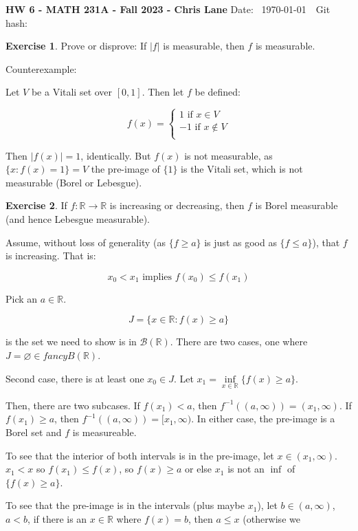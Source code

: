 \documentclass[11pt,oneside]{article}
\numberwithin{equation}{section}
\theoremstyle{definition}
\newtheorem{exercise}{Exercise}
\def\RR{\mathbb{R}}
\def\fancyB{\mathscr{B}}
\begin{document}
\textbf{HW 6 - MATH 231A - Fall 2023 - Chris Lane}
Date: \hhmmsstime{} \ \today \ \ Git hash: 

\begin{exercise}
  Prove or disprove: If $ |f| $ is measurable, then $f$ is measurable.
\end{exercise}
\begin{solution}
  Counterexample:

  Let $V$ be a Vitali set over $[0,1]$.  Then let $f$ be defined:

  $$
  f(x) = \begin{cases}
    1 \textrm{ if } x \in V \\
    -1 \textrm{ if } x \notin V \\
  \end{cases}
  $$

  Then $|f(x)| = 1$, identically.  But $f(x)$ is not measurable, as $
  \{ x : f(x) = 1 \} = V$ the pre-image of $\{1\}$ is the Vitali set,
  which is not measurable (Borel or Lebesgue).
\end{solution}

\begin{exercise}
  If $ f: \RR \to \RR$ is increasing or decreasing, then $f$ is Borel
  measurable (and hence Lebesgue measurable).

  Assume, without loss of generality (as $ \{ f \geq a \} $ is just as good as $ \{ f \leq a \}$),
  that $f$ is increasing.  That is:

  $$
  x_0 < x_1 \text { implies } f(x_0) \leq f(x_1)
  $$

  Pick an $a \in \RR$.

  $$
  J = \{ x \in \RR : f(x) \geq a \}
  $$

  is the set we need to show is in $\fancyB(\RR)$.  There are two cases, one
  where $ J = \varnothing \in fancyB(\RR)$.

  Second case, there is at least one $x_0 \in J$.
  Let $x_1 = \inf \limits _ { x \in \RR } \{ f(x) \geq a \}$.
  
  Then, there are two subcases.  If $f(x_1) < a$,
  then $f^{-1} ((a,  \infty)) = (x_1, \infty)$.  If $f(x_1) \geq a$,
  then $f^{-1} ((a, \infty)) = [x_1, \infty)$.
  In either case, the pre-image is a Borel
  set and $f$ is measureable.
    
  To see that the interior of both intervals is in the pre-image,
  let $x \in (x_1, \infty)$.  $x_1 < x$ so $f(x_1) \leq f(x)$, so $f(x) \geq a$
  or else $x_1$ is not an $\inf $ of $ \{ f(x) \geq a \}$.  

  To see that the pre-image is in the intervals (plus maybe $x_1$),
  let $b \in (a, \infty)$, $a<b$, if there is an $x \in \RR$ where $f(x) = b$, then
  $a \leq x$ (otherwise we 
  
\end{exercise}
\begin{solution}
\end{solution}


\begin{comment}
\begin{exercise}
  problem
\end{exercise}
\begin{solution}
\begin{enumerate}[(a)]
\item
  first answer
\end{enumerate}
\end{solution}
\end{comment}
\end{document}
